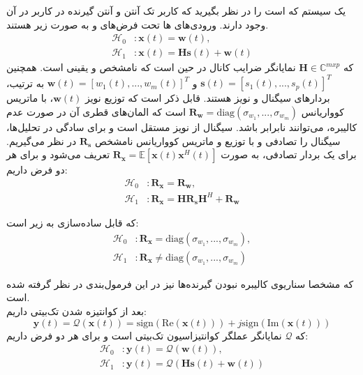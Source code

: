 
یک سیستم  که  است را در نظر بگیرید که
کاربر  تک آنتن و
آنتن گیرنده در کاربر  در آن وجود دارند. ورودی‌های ها تحت فرض‌های 
و
به صورت زیر هستند.
\begin{align}
	\mathcal{H}_0 &: \mathbf{x}(t) = \mathbf{w}(t), \\
	\mathcal{H}_1 &: \mathbf{x}(t) = \mathbf{H}\mathbf{s}(t) + \mathbf{w}(t)
\end{align}
که 
$\mathbf{H}\in\mathbb{C}^{mxp}$
نمایانگر ضرایب کانال در حین  است که نامشخص و یقینی است. همچنین
$\mathbf{s}(t)=[s_1(t), ..., s_p(t)]^T$
و
$\mathbf{w}(t)=[w_1(t), ..., w_m(t)]^T$
به ترتیب، بردارهای سیگنال و نویز هستند. قابل ذکر است که توزیع نویز
$\mathbf{w}(t)$،
 با ماتریس کوواریانس
$\mathbf{R}_\mathbf{w}=\mathrm{diag}(\sigma_{w_1}, ..., \sigma_{w_m})$
است که المان‌های قطری آن در صورت عدم کالیبره، می‌توانند نابرابر باشد. سیگنال از  نویز مستقل است و برای سادگی در تحلیل‌ها، سیگنال را تصادفی و با توزیع  و ماتریس کوواریانس نامشخص 
$\mathbf{R}_\mathbf{s}$
در نظر می‌گیریم. 
برای یک بردار تصادفی،  به صورت
$\mathbf{R}_\mathbf{x}=\mathbb{E}[\mathbf{x}(t)\mathbf{x}^H(t)]$
تعریف می‌شود و برای هر دو فرض داریم:
\begin{align}
	\mathcal{H}_0 &: \mathbf{R}_\mathbf{x} = \mathbf{R}_\mathbf{w}, \\
	\mathcal{H}_1 &: \mathbf{R}_\mathbf{x} = \mathbf{H}\mathbf{R}_\mathbf{s}\mathbf{H}^H + \mathbf{R}_\mathbf{w}
\end{align}

که قابل ساده‌سازی به زیر است:
\begin{align}
	\mathcal{H}_0 &: \mathbf{R}_\mathbf{x} = \mathrm{diag}(\sigma_{w_1}, ..., \sigma_{w_m}), \\
	\mathcal{H}_1 &: \mathbf{R}_\mathbf{x} \neq \mathrm{diag}(\sigma_{w_1}, ..., \sigma_{w_m})
\end{align}

که مشخصا سناریوی کالیبره نبودن گیرنده‌ها نیز در این فرمول‌بندی در نظر گرفته شده است.
\\
بعد از کوانتیزه شدن تک‌بیتی داریم:
$$\mathbf{y}(t)=\mathcal{Q}(\mathbf{x}(t))=\mathrm{sign}(\mathrm{Re}(\mathbf{x}(t)))+j\mathrm{sign}(\mathrm{Im}(\mathbf{x}(t)))$$
که
$\mathcal{Q}$
نمایانگر عملگر کوانتیزاسیون تک‌بیتی است و برای هر دو فرض داریم:
\begin{align}
	\mathcal{H}_0 &: \mathbf{y}(t) = \mathcal{Q}(\mathbf{w}(t)), \\
	\mathcal{H}_1 &: \mathbf{y}(t) = \mathcal{Q}(\mathbf{H}\mathbf{s}(t)+\mathbf{w}(t))
\end{align}

